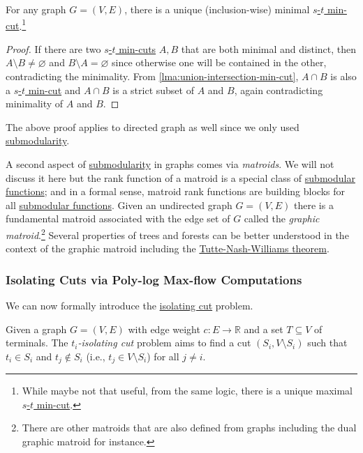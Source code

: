 \begin{corollary}\label{col:union-intersection-min-cut}
	For any graph \(G = (V, E)\), there is a unique (inclusion-wise) minimal \hyperref[prb:s-t-min-cut]{\(s\)-\(t\) min-cut}.\footnote{While maybe not that useful, from the same logic, there is a unique maximal \hyperref[prb:s-t-min-cut]{\(s\)-\(t\) min-cut}.}
\end{corollary}
\begin{proof}
	If there are two \hyperref[prb:s-t-min-cut]{\(s\)-\(t\) min-cuts} \(A, B\) that are both minimal and distinct, then \(A\setminus B \neq \varnothing \) and \(B \setminus A = \varnothing \) since otherwise one will be contained in the other, contradicting the minimality. From \autoref{lma:union-intersection-min-cut}, \(A \cap B\) is also a \hyperref[prb:s-t-min-cut]{\(s\)-\(t\) min-cut} and \(A \cap B\) is a strict subset of \(A\) and \(B\), again contradicting minimality of \(A\) and \(B\).
\end{proof}

The above proof applies to directed graph as well since we only used \hyperref[def:submodular]{submodularity}.

\begin{remark}
	A second aspect of \hyperref[def:submodular]{submodularity} in graphs comes via \emph{matroids}. We will not discuss it here but the rank function of a matroid is a special class of \hyperref[def:submodular]{submodular functions}; and in a formal sense, matroid rank functions are building blocks for all \hyperref[def:submodular]{submodular functions}. Given an undirected graph \(G = (V, E)\) there is a fundamental matroid associated with the edge set of \(G\) called the \emph{graphic matroid}.\footnote{There are other matroids that are also defined from graphs including the dual graphic matroid for instance.} Several properties of trees and forests can be better understood in the context of the graphic matroid including the \hyperref[thm:Tutte-Nash-Williams]{Tutte-Nash-Williams theorem}.
\end{remark}

\subsubsection{Isolating Cuts via Poly-log Max-flow Computations}
We can now formally introduce the \hyperref[prb:isolating-cut]{isolating cut} problem.

\begin{problem}\label{prb:isolating-cut}
Given a graph \(G = (V, E)\) with edge weight \(c \colon E \to \mathbb{R} \) and a set \(T \subseteq V\) of terminals. The \emph{\(t_i\)-isolating cut} problem aims to find a cut \((S_i, V\setminus S_i)\) such that \(t_i \in S_i\) and \(t_j \notin S_i\) (i.e., \(t_j \in V \setminus S_i\)) for all \(j \neq i\).
\end{problem}

